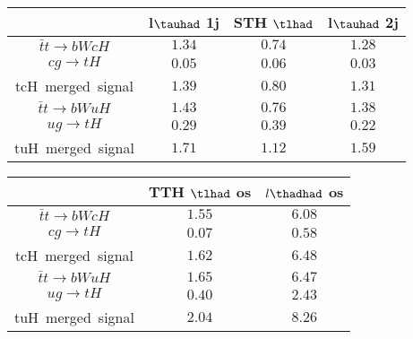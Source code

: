 \centering
\begin{tabular}{|c|c|c|c|} \hline
 & l$\tauhad$ 1j   & STH $\tlhad$    & l$\tauhad$ 2j  \\\hline
$\bar{t}t\to bWcH$ & $1.34$ & $0.74$ & $1.28$\\\hline
$cg\to tH$ & $0.05$ & $0.06$ & $0.03$\\\hline
tcH~merged~signal & $1.39$ & $0.80$ & $1.31$\\\hline
$\bar{t}t\to bWuH$ & $1.43$ & $0.76$ & $1.38$\\\hline
$ug\to tH$ & $0.29$ & $0.39$ & $0.22$\\\hline
tuH~merged~signal & $1.71$ & $1.12$ & $1.59$\\\hline
\end{tabular}
\begin{tabular}{|c|c|c|} \hline
 & TTH $\tlhad$ os   & $l\thadhad$ os\\\hline
$\bar{t}t\to bWcH$ & $1.55$ & $6.08$\\\hline
$cg\to tH$ & $0.07$ & $0.58$\\\hline
tcH~merged~signal & $1.62$ & $6.48$\\\hline
$\bar{t}t\to bWuH$ & $1.65$ & $6.47$\\\hline
$ug\to tH$ & $0.40$ & $2.43$\\\hline
tuH~merged~signal & $2.04$ & $8.26$\\\hline
\end{tabular}
